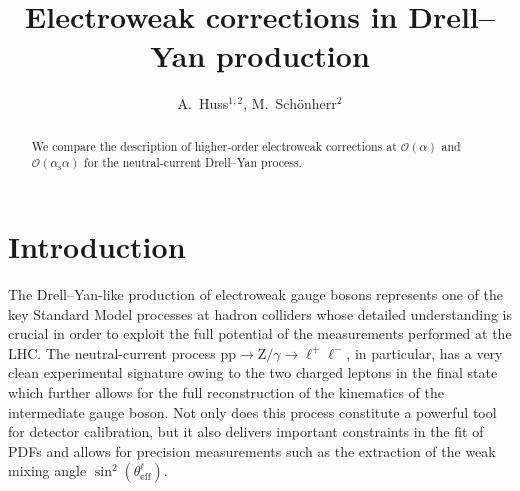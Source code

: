 \documentclass[11pt]{cernrep}
\newcommand{\order}{\ensuremath{\mathcal{O}}}
\newcommand{\alphas}{\ensuremath{\alpha_\mathrm{s}}}
\DeclareRobustCommand{\PZ}{{\ensuremath{\mathrm{Z}}}}
\DeclareRobustCommand{\Pl}{{\ensuremath{\ell}}}
\DeclareRobustCommand{\Plp}{{\ensuremath{\ell^+}}}
\DeclareRobustCommand{\Plm}{{\ensuremath{\ell^-}}}
\DeclareRobustCommand{\Pp}{{\ensuremath{\mathrm{p}}}}
\begin{document}
\title{Electroweak corrections in Drell--Yan production}

\author{
  A.\ Huss$^{1,2}$,
  M.\ Sch\"onherr$^2$
}

\maketitle

\begin{abstract}
  We compare the description of higher-order electroweak corrections at 
  $\order(\alpha)$ and $\order(\alphas\alpha)$ for the neutral-current 
  Drell--Yan process.
\end{abstract}


\section{Introduction}
\label{sec:dyew:intro}

The Drell--Yan-like production of electroweak gauge bosons represents one of the key Standard Model processes at hadron colliders whose detailed understanding is crucial in order to exploit the full potential of the measurements performed at the LHC.
The neutral-current process $\Pp\Pp\to\PZ/\gamma\to\Plp\Plm$, in particular, has a very clean experimental signature owing to the two charged leptons in the final state which further allows for the full reconstruction of the kinematics of the intermediate gauge boson.
Not only does this process constitute a powerful tool for detector calibration, but it also delivers important constraints in the fit of PDFs and allows for precision measurements such as the extraction of the weak mixing angle $\sin^2(\theta^{\Pl}_\mathrm{eff})$.
\end{document}

